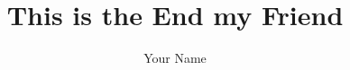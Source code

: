 \documentclass{hasel_phd_thesis}
\title{This is the End my Friend}
\author{Your Name}
\begin{document}


\onehalfspace

\frontmatter



\begin{otherlanguage}{ngerman}

\end{otherlanguage}

\tableofcontents

\listoffigures

\vspace{0.1em}

\listoftables

\vspace{0.1em}

\newpage
\thispagestyle{empty}

\mainmatter

%




%
%
%

\backmatter




\end{document}
